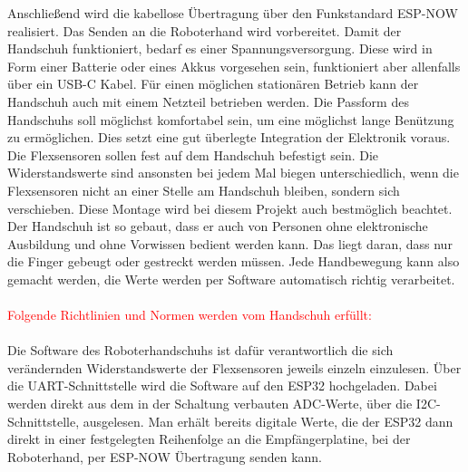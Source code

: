 \documentclass[11pt]{article}
\begin{document}
Anschließend wird die kabellose 
Übertragung über den Funkstandard ESP-NOW realisiert. Das Senden an die Roboterhand wird vorbereitet. Damit der Handschuh 
funktioniert, bedarf es einer Spannungsversorgung. Diese wird in Form einer Batterie oder eines Akkus vorgesehen sein, 
funktioniert aber allenfalls über ein USB-C Kabel. Für einen möglichen stationären Betrieb kann der Handschuh auch mit einem 
Netzteil betrieben werden. Die Passform des Handschuhs soll möglichst komfortabel sein, um eine möglichst lange Benützung zu 
ermöglichen. Dies setzt eine gut überlegte Integration der Elektronik voraus. Die Flexsensoren sollen fest auf dem Handschuh 
befestigt sein. Die Widerstandswerte sind ansonsten bei jedem Mal biegen unterschiedlich, wenn die Flexsensoren nicht an einer 
Stelle am Handschuh bleiben, sondern sich verschieben. Diese Montage wird bei diesem Projekt auch bestmöglich beachtet. Der 
Handschuh ist so gebaut, dass er auch von Personen ohne elektronische Ausbildung und ohne Vorwissen bedient werden kann. Das 
liegt daran, dass nur die Finger gebeugt oder gestreckt werden müssen. Jede Handbewegung kann also gemacht werden, die Werte 
werden per Software automatisch richtig verarbeitet. \\
\\
\textcolor{red}{Folgende Richtlinien und Normen werden vom Handschuh erfüllt:}\\
\\
Die Software des Roboterhandschuhs ist dafür verantwortlich die sich verändernden Widerstandswerte der Flexsensoren 
jeweils einzeln einzulesen. Über die UART-Schnittstelle wird die Software auf den ESP32 hochgeladen. Dabei werden 
direkt aus dem in der Schaltung verbauten ADC-Werte, über die I2C-Schnittstelle, ausgelesen. Man erhält bereits digitale 
Werte, die der ESP32 dann direkt in einer festgelegten Reihenfolge an die Empfängerplatine, bei der Roboterhand, per 
ESP-NOW Übertragung senden kann.
\end{document}
